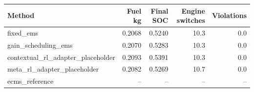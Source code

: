 \begin{tabular}{lrrrr}
\toprule
Method & Fuel kg & Final SOC & Engine switches & Violations \\
\midrule
fixed\_ems & 0.2068 & 0.5240 & 10.3 & 0.0 \\
gain\_scheduling\_ems & 0.2070 & 0.5283 & 10.3 & 0.0 \\
contextual\_rl\_adapter\_placeholder & 0.2093 & 0.5391 & 10.3 & 0.0 \\
meta\_rl\_adapter\_placeholder & 0.2082 & 0.5269 & 10.7 & 0.0 \\
ecms\_reference & -- & -- & -- & -- \\
\bottomrule
\end{tabular}
